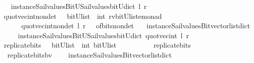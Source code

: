 \begin{isabellebody}
\ \ \ instance{\isacharunderscore}Sail{}{\isacharunderscore}values{\isacharunderscore}BitU{\isacharunderscore}Sail{}{\isacharunderscore}values{\isacharunderscore}bitU{\isacharunderscore}dict{\isacharparenright}\ l\ r{\isacharparenright}{\isacharparenright}{\isachardoublequoteclose}\isanewline
\isanewline
{}\isamarkupfalse%
\ quot{\isacharunderscore}vec{\isacharunderscore}int{\isacharunderscore}nondet\ \ {\isacharcolon}{\isacharcolon}\ {\isachardoublequoteopen}{\isacharparenleft}bitU{\isacharparenright}list\ {\isasymRightarrow}\ int\ {\isasymRightarrow}{\isacharparenleft}{\isacharprime}rv{\isacharcomma}{\isacharparenleft}{\isacharparenleft}bitU{\isacharparenright}list{\isacharparenright}{\isacharcomma}{\isacharprime}e{\isacharparenright}monad\ {\isachardoublequoteclose}\ \ \ \isanewline
\ \ \ \ \ {\isachardoublequoteopen}\ quot{\isacharunderscore}vec{\isacharunderscore}int{\isacharunderscore}nondet\ l\ r\ {\isacharequal}\ {\isacharparenleft}\ of{\isacharunderscore}bits{\isacharunderscore}nondet\ \isanewline
\ \ {\isacharparenleft}instance{\isacharunderscore}Sail{}{\isacharunderscore}values{\isacharunderscore}Bitvector{\isacharunderscore}list{\isacharunderscore}dict\isanewline
\ \ \ \ \ instance{\isacharunderscore}Sail{}{\isacharunderscore}values{\isacharunderscore}BitU{\isacharunderscore}Sail{}{\isacharunderscore}values{\isacharunderscore}bitU{\isacharunderscore}dict{\isacharparenright}\ {\isacharparenleft}quot{\isacharunderscore}vec{\isacharunderscore}int\ l\ r{\isacharparenright}{\isacharparenright}{\isachardoublequoteclose}\isanewline
\isanewline
\isanewline
%
\isanewline
{}\isamarkupfalse%
\ replicate{\isacharunderscore}bits\ \ {\isacharcolon}{\isacharcolon}\ {\isachardoublequoteopen}{\isacharparenleft}bitU{\isacharparenright}list\ {\isasymRightarrow}\ int\ {\isasymRightarrow}{\isacharparenleft}bitU{\isacharparenright}list\ {\isachardoublequoteclose}\ \ \ \isanewline
\ \ \ \ \ {\isachardoublequoteopen}\ replicate{\isacharunderscore}bits\ {\isacharequal}\ {\isacharparenleft}\ \isanewline
\ \ replicate{\isacharunderscore}bits{\isacharunderscore}bv\isanewline
\ \ \ \ {\isacharparenleft}instance{\isacharunderscore}Sail{}{\isacharunderscore}values{\isacharunderscore}Bitvector{\isacharunderscore}list{\isacharunderscore}dict\isanewline

\end{isabellebody}
